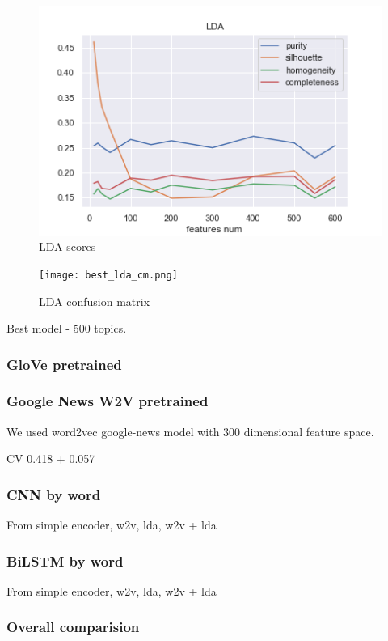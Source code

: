 \documentclass[11pt]{article}
\begin{document}
 \begin{figure}[h]
 	\centering
 	\includegraphics[scale=0.7]{lda_scores.png}
	\caption{LDA scores}
 \label{words_freq}
 \end{figure}

 \begin{figure}[h]
 	\centering
 	\texttt{[image: best\_lda\_cm.png]}
	\caption{LDA confusion matrix}
 \label{words_freq}
 \end{figure}


Best model - 500 topics.


\subsubsection{GloVe pretrained}

\subsubsection{Google News W2V pretrained}

We used word2vec google-news model with 300 dimensional feature space.


CV 0.418 + 0.057%

\subsubsection{CNN by word}

From simple encoder, w2v, lda, w2v + lda

\subsubsection{BiLSTM by word}

From simple encoder, w2v, lda, w2v + lda

\subsubsection{Overall comparision}
\end{document}
